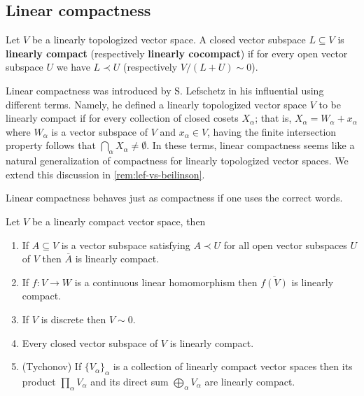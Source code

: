 \subsection*{Linear compactness}
\begin{definition}\label{def:linear_compactness}
	Let $V$ be a linearly topologized vector space. A closed vector subspace $L \subseteq V$ is \textbf{linearly compact} (respectively \textbf{linearly cocompact}) if for every open vector subspace $U$ we have $L \prec U$ (respectively $V/(L+U) \sim 0$). 
\end{definition}
\begin{remark}\label{rem:lefschetz-linear-compactness}
	Linear compactness was introduced by S. Lefschetz in his influential \cite{Lefschetz-Alg-Top} using different terms. Namely, he defined a linearly topologized vector space $V$ to be linearly compact if for every collection of closed cosets $X_{\alpha}$; that is, $X_{\alpha} = W_{\alpha} + x_{\alpha}$ where $W_{\alpha}$ is a vector subspace of $V$ and $x_{\alpha}\in V$, having the finite intersection property follows that $\bigcap_{\alpha} X_{\alpha} \neq \emptyset$. In these terms, linear compactness seems like a natural generalization of compactness for linearly topologized vector spaces. We extend this discussion in \cref{rem:lef-vs-beilinson}.
\end{remark}
Linear compactness behaves just as compactness if one uses the correct words.
\begin{proposition}\label{prop:linear_compactness_properties}
	Let $V$ be a linearly compact vector space, then
	\begin{enumerate}[label = (\alph*)]
		\item If $A \subseteq V$ is a vector subspace satisfying $A \prec U$ for all open vector subspaces $U$ of $V$ then $\overline{A}$ is linearly compact.
		\item If $f\colon V \to W$ is a continuous linear homomorphism then $\overline{f(V)}$ is linearly compact.
		\item If $V$ is discrete then $V \sim 0$.
		\item Every closed vector subspace of $V$ is linearly compact.
		\item (Tychonov) If $\{V_{\alpha}\}_{\alpha}$ is a collection of linearly compact vector spaces then its product $\prod_{\alpha} V_{\alpha}$ and its direct sum $\bigoplus_{\alpha}V_{\alpha}$ are linearly compact.
	\end{enumerate}
\end{proposition}
